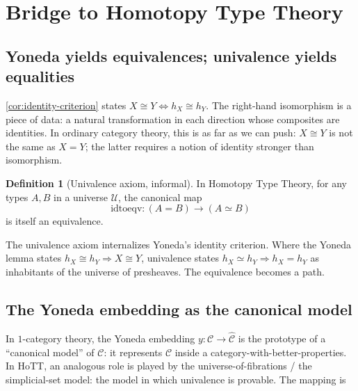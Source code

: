 \documentclass[12pt]{article}
\theoremstyle{definition}
\newtheorem{definition}[theorem]{Definition}
\theoremstyle{remark}
\begin{document}
\section{Bridge to Homotopy Type Theory}
\label{sec:bridge-hott}

\subsection{Yoneda yields equivalences; univalence yields equalities}

\cref{cor:identity-criterion} states $X \cong Y \iff h_X \cong h_Y$. The right-hand isomorphism is a piece of data: a natural transformation in each direction whose composites are identities. In ordinary category theory, this is as far as we can push: $X \cong Y$ is not the same as $X = Y$; the latter requires a notion of identity stronger than isomorphism.

\begin{definition}[Univalence axiom, informal]
\label{def:univalence}
In Homotopy Type Theory, for any types $A, B$ in a universe $\mathcal{U}$, the canonical map
\[
\mathrm{idtoeqv}\colon (A = B) \longrightarrow (A \simeq B)
\]
is itself an equivalence.
\end{definition}

The univalence axiom internalizes Yoneda's identity criterion. Where the Yoneda lemma states $h_X \cong h_Y \Rightarrow X \cong Y$, univalence states $h_X \simeq h_Y \Rightarrow h_X = h_Y$ as inhabitants of the universe of presheaves. The equivalence becomes a path.

\subsection{The Yoneda embedding as the canonical model}

In $1$-category theory, the Yoneda embedding $y\colon \mathcal{C} \to \widehat{\mathcal{C}}$ is the prototype of a ``canonical model'' of $\mathcal{C}$: it represents $\mathcal{C}$ inside a category-with-better-properties. In HoTT, an analogous role is played by the universe-of-fibrations / the simplicial-set model: the model in which univalence is provable. The mapping is
\end{document}
